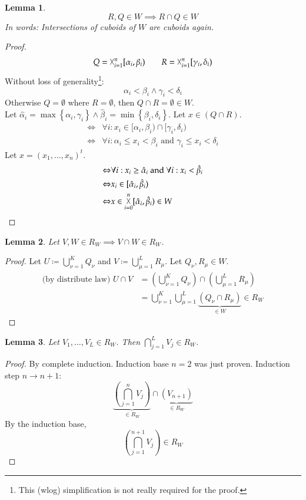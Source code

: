 \documentclass{article}
\newtheorem{lemma}{Lemma}  \numberwithin{lemma}{section}
\newcommand{\set}[1]{\left\{#1\right\}}
\DeclareMathOperator*{\bigtimes}{\vartimes}
\begin{document}
\begin{lemma}
  \label{l:two}
  \[ R, Q \in W \implies R \cap Q \in W \]
  In words: Intersections of cuboids of $W$ are cuboids again.
\end{lemma}
\begin{proof}
  \[ Q = {\bigtimes}_{i=1}^n [\alpha_i, \beta_i) \qquad R = {\bigtimes}_{i=1}^n [\gamma_i, \delta_i) \]
  Without loss of generality\footnote{This (wlog) simplification is not really required for the proof.}:
  \[ \alpha_i < \beta_i \land \gamma_i < \delta_i \]
  Otherwise $Q = \emptyset$ where $R = \emptyset$, then $Q \cap R = \emptyset \in W$. \\
  Let $\hat \alpha_i = \max\set{\alpha_i, \gamma_i} \land \hat \beta_i = \min\set{\beta_i, \delta_i}$.
  Let $x \in (Q \cap R)$.
  \begin{align*}
    \Leftrightarrow & \forall i: x_i \in [\alpha_i, \beta_i) \cap [\gamma_i, \delta_i) \\
    \Leftrightarrow & \forall i: \alpha_i \leq x_i < \beta_i \text{ and } \gamma_i \leq x_i < \delta_i
  \end{align*}
  Let $x = (x_1, \ldots, x_n)^t$.
  \begin{align*}
    \Leftrightarrow & \forall i: x_i \geq \hat \alpha_i \text{ and } \forall i: x_i < \hat \beta_i \\
    \Leftrightarrow & x_i \in [\hat\alpha_i, \hat\beta_i) \\
    \Leftrightarrow & x \in \bigtimes_{i=0}^n [\hat\alpha_i, \hat\beta_i) \in W
  \end{align*}
\end{proof}

\begin{lemma}
  \label{l:three}
  Let $V, W \in R_W \implies V \cap W \in R_{W}$.
\end{lemma}
\begin{proof}
  Let $U \coloneqq \bigcup_{\nu=1}^K Q_\nu$ and $V \coloneqq \bigcup_{\mu=1}^L R_\mu$.
  Let $Q_{\nu}, R_{\mu} \in W$.
  \begin{align*}
    \text{(by distribute law) } U \cap V
      &= \left(\bigcup_{\nu=1}^K Q_\nu\right) \cap \left(\bigcup_{\mu=1}^L R_\mu\right) \\
      &= \bigcup_{\nu=1}^K \bigcup_{\mu=1}^L \underbrace{\left(Q_\nu \cap R_\mu\right)}_{\in W} \in R_{W}
  \end{align*}
\end{proof}

\begin{lemma}
  \label{l:four}
  Let $V_1, \ldots, V_L \in R_{W}$. Then $\bigcap_{j=1}^L V_j \in R_{W}$.
\end{lemma}
\begin{proof}
  By complete induction. Induction base $n=2$ was just proven.
  Induction step $n \to n + 1$:
  \[
     \underbrace{\left(\bigcap_{j=1}^n V_j\right)}_{\in R_W}
     \cap
     \underbrace{\left(V_{n+1}\right)}_{\in R_W}
  \]
  By the induction base,
  \[ {\left(\bigcap_{j=1}^{n+1} V_j\right)} {\in R_W} \]
\end{proof}
\end{document}
